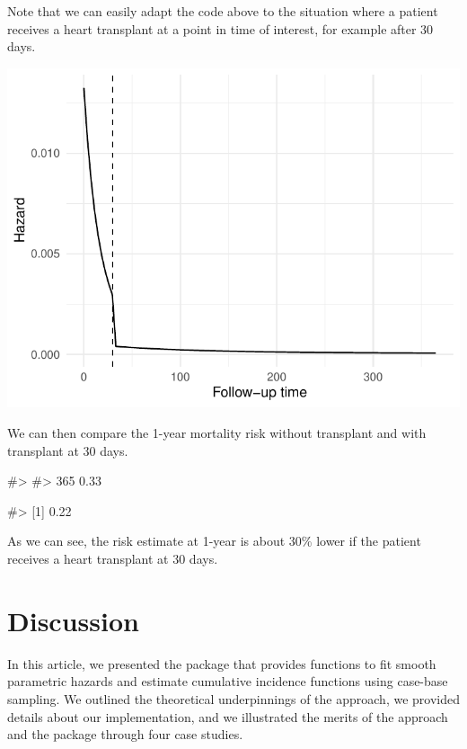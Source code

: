 \documentclass[
]{jss}
\begin{document}
Note that we can easily adapt the code above to the situation where a
patient receives a heart transplant at a point in time of interest, for
example after 30 days.

\begin{CodeChunk}


\begin{center}\includegraphics{../figures/stanford-1y-haz-1} \end{center}

\end{CodeChunk}

We can then compare the 1-year mortality risk without transplant and
with transplant at 30 days.

\begin{CodeChunk}

\begin{CodeOutput}
#>         
#> 365 0.33
\end{CodeOutput}

\begin{CodeOutput}
#> [1] 0.22
\end{CodeOutput}
\end{CodeChunk}

As we can see, the risk estimate at 1-year is about 30\% lower if the
patient receives a heart transplant at 30 days.

\hypertarget{discussion}{%
\section{Discussion}\label{discussion}}

In this article, we presented the  package 
that provides functions to fit smooth parametric hazards and estimate
cumulative incidence functions using case-base sampling. We outlined the
theoretical underpinnings of the approach, we provided details about our
implementation, and we illustrated the merits of the approach and the
package through four case studies.
\end{document}
